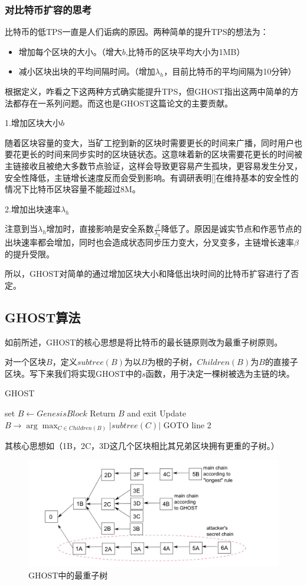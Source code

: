 \subsubsection{对比特币扩容的思考}
比特币的低TPS一直是人们诟病的原因。两种简单的提升TPS的想法为：
\begin{itemize}
	\item 增加每个区块的大小。（增大$b$,比特币的区块平均大小为1MB）
	\item 减小区块出块的平均间隔时间。（增加$\lambda_h$，目前比特币的平均间隔为10分钟）
\end{itemize}
根据定义，咋看之下这两种方式确实能提升TPS，但{\color{red}GHOST指出这两中简单的方法都存在一系列问题。而这也是GHOST这篇论文的主要贡献。}

1.增加区块大小$b$

随着区块容量的变大，当矿工挖到新的区块时需要更长的时间来广播，同时用户也要花更长的时间来同步实时的区块链状态。这意味着新的区块需要花更长的时间被主链接收且被绝大多数节点验证，这样会导致更容易产生孤块，更容易发生分叉，安全性降低，主链增长速度反而会受到影响。有调研表明[]在维持基本的安全性的情况下比特币区块容量不能超过8M。

2.增加出块速率$\lambda_h$

注意到当$\lambda_h$增加时，直接影响是安全系数$\frac{\beta}{\lambda_h}$降低了。原因是诚实节点和作恶节点的出块速率都会增加，同时也会造成状态同步压力变大，分叉变多，主链增长速率$\beta$的提升受限。

所以，GHOST对简单的通过增加区块大小和降低出块时间的比特币扩容进行了否定。

\subsection{GHOST算法}
如前所述，GHOST的核心思想是将比特币的最长链原则改为最重子树原则。

对一个区块$B$，定义$subtree(B)$为以$B$为根的子树，$Children(B)$为$B$的直接子区块。写下来我们将实现GHOST中的$s$函数，用于决定一棵树被选为主链的块。

\begin{algorithm}[H]
	\caption{GHOST}%
   set $B \leftarrow Genesis Block$\;
    {Return $B$ and exit\;}
   {Update $B\rightarrow \arg\max_{C \in Children(B)}|subtree(C)|$\;}
	GOTO line 2\;
\end{algorithm}
其核心思想如（1B，2C，3D这几个区块相比其兄弟区块拥有更重的子树。）
\begin{figure}
	\centering
	\includegraphics[width=1\textwidth]{../common/GHOST_1.png}
	\caption{GHOST中的最重子树} 
	\label{fig:GHOST1}
\end{figure}


